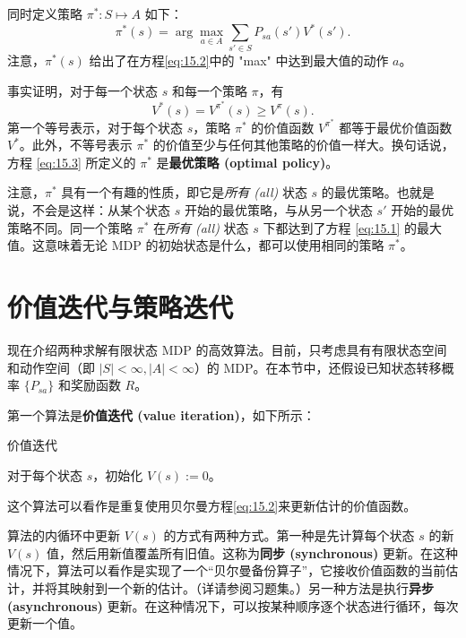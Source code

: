 同时定义策略 $\pi^*: S \mapsto A$ 如下：
\begin{equation}
    \pi^*(s) = \arg \max_{a \in A} \sum_{s' \in S} P_{sa}(s') V^*(s').
    \label{eq:15.3}
\end{equation}
注意，$\pi^*(s)$ 给出了在方程\eqref{eq:15.2}中的 "max" 中达到最大值的动作 $a$。

事实证明，对于每一个状态 $s$ 和每一个策略 $\pi$，有
\[
    V^*(s) = V^{\pi^*}(s) \ge V^\pi(s).
\]
第一个等号表示，对于每个状态 $s$，策略 $\pi^*$ 的价值函数 $V^{\pi^*}$ 都等于最优价值函数 $V^*$。此外，不等号表示 $\pi^*$ 的价值至少与任何其他策略的价值一样大。换句话说，方程 \eqref{eq:15.3} 所定义的 $\pi^*$ 是\textbf{最优策略 (optimal policy)}。

注意，$\pi^*$ 具有一个有趣的性质，即它是\textit{所有 (all)} 状态 $s$ 的最优策略。也就是说，不会是这样：从某个状态 $s$ 开始的最优策略，与从另一个状态 $s'$ 开始的最优策略不同。同一个策略 $\pi^*$ 在\textit{所有 (all)} 状态 $s$ 下都达到了方程 \eqref{eq:15.1} 的最大值。这意味着无论 MDP 的初始状态是什么，都可以使用相同的策略 $\pi^*$。

\section{价值迭代与策略迭代}\label{sec:15.2}

现在介绍两种求解有限状态 MDP 的高效算法。目前，只考虑具有有限状态空间和动作空间（即 $|S| < \infty, |A| < \infty$）的 MDP。在本节中，还假设已知状态转移概率 $\{P_{sa}\}$ 和奖励函数 $R$。

第一个算法是\textbf{价值迭代 (value iteration)}，如下所示：

\vspace{0.5em}
\begin{algorithm}[H]
    \SetAlgoNoLine
    \label{algo:4}
    \caption{价值迭代}
    对于每个状态 $s$，初始化 $V(s) := 0$。\\
\end{algorithm}

这个算法可以看作是重复使用贝尔曼方程\eqref{eq:15.2}来更新估计的价值函数。

算法的内循环中更新 $V(s)$ 的方式有两种方式。第一种是先计算每个状态 $s$ 的新 $V(s)$ 值，然后用新值覆盖所有旧值。这称为\textbf{同步 (synchronous)} 更新。在这种情况下，算法可以看作是实现了一个“贝尔曼备份算子”，它接收价值函数的当前估计，并将其映射到一个新的估计。（详请参阅习题集。）另一种方法是执行\textbf{异步 (asynchronous)} 更新。在这种情况下，可以按某种顺序逐个状态进行循环，每次更新一个值。

